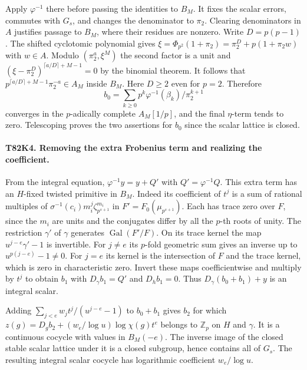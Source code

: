 Apply $\varphi^{-1}$ there before passing the identities to $B_M$.
It fixes the scalar errors, commutes with $G_s$, and changes the
denominator to $\pi_2$. Clearing denominators in $A$ justifies
passage to $B_M$, where their residues are nonzero. Write $D=p(p-1)$.
The shifted cyclotomic polynomial gives
$\xi=\Phi_{p^2}(1+\pi_2)=\pi_2^D+p(1+\pi_2 w)$ with $w\in A$.
Modulo $(\pi_2^a,\xi^M)$ the second factor is a unit and
$(\xi-\pi_2^D)^{\lceil a/D\rceil+M-1}=0$ by the binomial theorem.
It follows that
$p^{\lceil a/D\rceil+M-1}\pi_2^{-a}\in A_M$ inside $B_M$.
Here $D\ge2$ even for $p=2$. Therefore
\[
 b_0=\sum_{k\ge0}p^k\varphi^{-1}(\beta_k)/\pi_2^{k+1}
\]
converges in the $p$-adically complete $A_M[1/p]$, and the final
$\eta$-term tends to zero. Telescoping proves the two assertions for
$b_0$ since the scalar lattice is closed.

\paragraph{T82K4. Removing the extra Frobenius term and realizing the coefficient.}
From the integral equation,
$\varphi^{-1}y=y+Q'$ with $Q'=\varphi^{-1}Q$. This extra term has
an $H$-fixed twisted primitive in $B_M$. Indeed its coefficient of
$t^j$ is a sum of rational multiples of
$\sigma^{-1}(c_i) m_i^j\zeta_{p^{s+1}}^{m_i}$ in
$F'=F_0(\mu_{p^{s+1}})$. Each has trace zero over $F$, since
the $m_i$ are units and the conjugates differ by all the $p$-th
roots of unity. The restriction $\gamma'$ of $\gamma$ generates
$\operatorname{Gal}(F'/F)$. On its trace kernel the map
$u^{j-e}\gamma'-1$ is invertible. For $j\ne e$ its $p$-fold
geometric sum gives an inverse up to $u^{p(j-e)}-1\ne0$.
For $j=e$ its kernel is the intersection of $F$ and the trace
kernel, which is zero in characteristic zero. Invert these maps
coefficientwise and multiply by $t^j$ to obtain $b_1$ with
$D_\gamma b_1=Q'$ and $D_h b_1=0$. Thus $D_\gamma(b_0+b_1)+y$
is an integral scalar.

Adding $\sum_{j<e}w_jt^j/(u^{j-e}-1)$ to $b_0+b_1$ gives $b_2$
for which $z(g)=D_g b_2+(w_e/\log u)\log\chi(g)t^e$ belongs
to $\mathbb Z_p$ on $H$ and $\gamma$. It is a continuous cocycle
with values in $B_M(-e)$. The inverse image of the closed stable
scalar lattice under it is a closed subgroup, hence contains all
of $G_s$. The resulting integral scalar cocycle has logarithmic
coefficient $w_e/\log u$.

